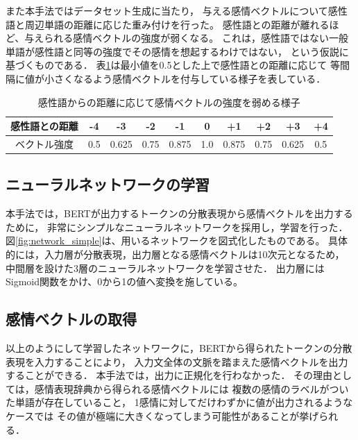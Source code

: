 			また本手法ではデータセット生成に当たり，
			与える感情ベクトルについて感性語と周辺単語の距離に応じた重み付けを行った。
			感性語との距離が離れるほど、与えられる感情ベクトルの強度が弱くなる。
			これは，感性語ではない一般単語が感性語と同等の強度でその感情を想起するわけではない，
			という仮説に基づくものである．
			表\ref{table:vector_weaken}は最小値を0.5とした上で感性語との距離に応じて
			等間隔に値が小さくなるよう感情ベクトルを付与している様子を表している．
			\begin{table}[H]
				\centering
				\caption{感性語からの距離に応じて感情ベクトルの強度を弱める様子}
				\label{table:vector_weaken}
					\begin{tabular}{cccccccccc}
						\hline
						感性語との距離 & -4 & -3 & -2 & -1 & 0 & +1 & +2 & +3 & +4 \\
						\hline
						ベクトル強度 & 0.5 & 0.625 & 0.75 & 0.875 & 1.0 & 0.875 & 0.75 & 0.625 & 0.5 \\
						\hline
					\end{tabular}
			\end{table}

		\subsection{ニューラルネットワークの学習}
			本手法では，BERTが出力するトークンの分散表現から感情ベクトルを出力するために，
			非常にシンプルなニューラルネットワークを採用し，学習を行った．
			図\ref{fig:network_simple}は、用いるネットワークを図式化したものである。
			具体的には，入力層が分散表現，出力層となる感情ベクトルは10次元となるため，
			中間層を設けた3層のニューラルネットワークを学習させた．
			出力層にはSigmoid関数をかけ、0から1の値へ変換を施している。

		\subsection{感情ベクトルの取得}
			以上のようにして学習したネットワークに，BERTから得られたトークンの分散表現を入力することにより，
			入力文全体の文脈を踏まえた感情ベクトルを出力することができる．
			本手法では，出力に正規化を行わなかった．
			その理由としては，感情表現辞典から得られる感情ベクトルには
			複数の感情のラベルがついた単語が存在していること，
			1感情に対してだけわずかに値が出力されるようなケースでは
			その値が極端に大きくなってしまう可能性があることが挙げられる．
